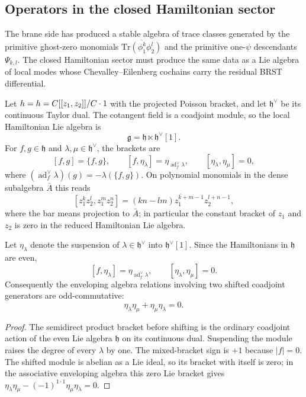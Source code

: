 \documentclass[11pt]{memoir}
\begin{document}
\subsection{Operators in the closed Hamiltonian sector}\label{sec:grav-ops}

The brane side has produced a stable algebra of trace classes generated
by the primitive ghost-zero monomials $\overline{\mathrm{Tr}(\phi_1^k\phi_2^l)}$
and the primitive one-$\psi$ descendants $\Psi_{k,l}$. The closed
Hamiltonian sector must produce the same data as a Lie algebra of local
modes whose Chevalley--Eilenberg cochains carry the residual BRST
differential.

Let $h=h=C[[z_1,z_2]]/C\cdot1$ with the
projected Poisson bracket, and let $\mathfrak h^\vee$ be its continuous Taylor
dual. The
cotangent field is a coadjoint module, so the local Hamiltonian Lie algebra is
$$\mathfrak g=\mathfrak h\ltimes\mathfrak h^\vee[1].$$
For $f,g\in\mathfrak h$ and $\lambda,\mu\in\mathfrak h^\vee$, the brackets are
$$[f,g]=\{f,g\},\qquad [f,\eta_\lambda]=\eta_{\operatorname{ad}^{\vee}_f\lambda},
  \qquad [\eta_\lambda,\eta_\mu]=0,$$
where $(\operatorname{ad}^{\vee}_f\lambda)(g)=-\lambda(\{f,g\})$.
On polynomial monomials in the dense subalgebra $\bar A$ this reads
$$[z_1^kz_2^l,z_1^mz_2^n]
  =\overline{(kn-lm)z_1^{k+m-1}z_2^{l+n-1}},$$
where the bar means projection to $\bar A$; in particular the constant bracket
of $z_1$ and $z_2$ is zero in the reduced Hamiltonian Lie algebra.

\begin{lem}\label{lem:shifted-coadjoint-signs}
  Let $\eta_\lambda$ denote the suspension of
  $\lambda\in\mathfrak h^\vee$ into $\mathfrak h^\vee[1]$. Since the
  Hamiltonians in $\mathfrak h$ are even,
  $$[f,\eta_\lambda]=\eta_{\operatorname{ad}^{\vee}_f\lambda},\qquad
    [\eta_\lambda,\eta_\mu]=0.$$
  Consequently the enveloping algebra relations involving two shifted
  coadjoint generators are odd-commutative:
  $$\eta_\lambda\eta_\mu+\eta_\mu\eta_\lambda=0.$$
\end{lem}

\begin{proof}
  The semidirect product bracket before shifting is the ordinary coadjoint
  action of the even Lie algebra $\mathfrak h$ on its continuous dual. Suspending
  the module raises the degree of every $\lambda$ by one. The mixed-bracket sign
  is $+1$ because $|f|=0$. The shifted module is
  abelian as a Lie ideal, so its bracket with itself is zero; in the associative
  enveloping algebra this zero Lie bracket gives
  $\eta_\lambda\eta_\mu-(-1)^{1\cdot1}\eta_\mu\eta_\lambda=0$.
\end{proof}
\end{document}

